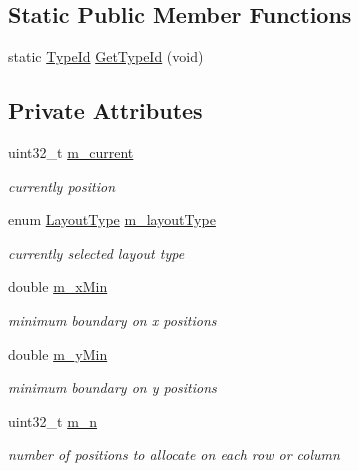 \subsection*{Static Public Member Functions}
\begin{DoxyCompactItemize}
\item 
static \hyperlink{classns3_1_1TypeId}{Type\+Id} \hyperlink{classns3_1_1GridPositionAllocator_aa0d3d564a2358bbee19c25ff398cbdc7}{Get\+Type\+Id} (void)
\end{DoxyCompactItemize}
\subsection*{Private Attributes}
\begin{DoxyCompactItemize}
\item 
uint32\+\_\+t \hyperlink{classns3_1_1GridPositionAllocator_a69e482564400a00aebd5592cfb39b428}{m\+\_\+current}
\begin{DoxyCompactList}\small\item\em currently position \end{DoxyCompactList}\item 
enum \hyperlink{classns3_1_1GridPositionAllocator_a31cab553ee810e780d5dce3ed4336b15}{Layout\+Type} \hyperlink{classns3_1_1GridPositionAllocator_a79b8999013bc912f50f47fbf43aa2654}{m\+\_\+layout\+Type}
\begin{DoxyCompactList}\small\item\em currently selected layout type \end{DoxyCompactList}\item 
double \hyperlink{classns3_1_1GridPositionAllocator_ad9c31c86707754e445ba7543537d693e}{m\+\_\+x\+Min}
\begin{DoxyCompactList}\small\item\em minimum boundary on x positions \end{DoxyCompactList}\item 
double \hyperlink{classns3_1_1GridPositionAllocator_a7f2c8a8cdd6799e48d77c90181fd6fe8}{m\+\_\+y\+Min}
\begin{DoxyCompactList}\small\item\em minimum boundary on y positions \end{DoxyCompactList}\item 
uint32\+\_\+t \hyperlink{classns3_1_1GridPositionAllocator_ae66a6e6c931f2444651650bedc9a1cc4}{m\+\_\+n}
\begin{DoxyCompactList}\small\item\em number of positions to allocate on each row or column \end{DoxyCompactList}\item 

\end{DoxyCompactItemize}

